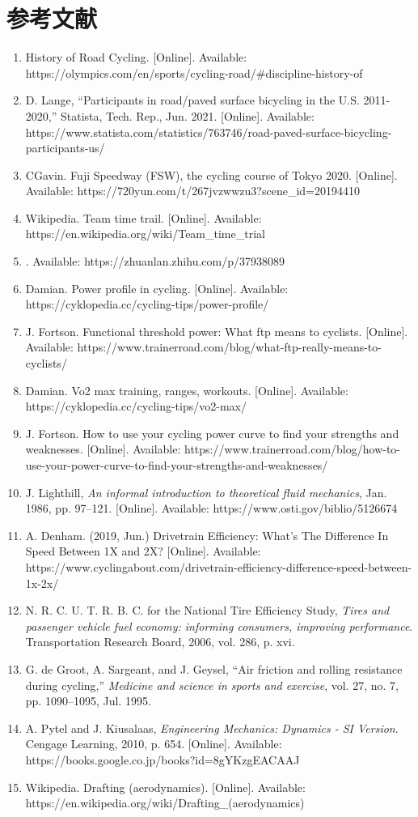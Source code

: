 \documentclass[11pt,a4paper]{ctexart}
\begin{document}
\section*{参考文献}
\begin{enumerate}
\item History of Road Cycling. [Online]. Available: https://olympics.com/en/sports/cycling-road/\#discipline-history-of
\item D. Lange, ``Participants in road/paved surface bicycling in the U.S. 2011-2020,'' Statista, Tech. Rep., Jun. 2021. [Online]. Available: https://www.statista.com/statistics/763746/road-paved-surface-bicycling-participants-us/
\item CGavin. Fuji Speedway (FSW), the cycling course of Tokyo 2020. [Online]. Available: https://720yun.com/t/267jvzwwzu3?scene\_id=20194410
\item Wikipedia. Team time trail. [Online]. Available: https://en.wikipedia.org/wiki/Team\_time\_trial
\item [Online]. Available: https://zhuanlan.zhihu.com/p/37938089
\item Damian. Power profile in cycling. [Online]. Available: https://cyklopedia.cc/cycling-tips/power-profile/
\item J. Fortson. Functional threshold power: What ftp means to cyclists. [Online]. Available: https://www.trainerroad.com/blog/what-ftp-really-means-to-cyclists/
\item Damian. Vo2 max training, ranges, workouts. [Online]. Available: https://cyklopedia.cc/cycling-tips/vo2-max/
\item J. Fortson. How to use your cycling power curve to find your strengths and weaknesses. [Online]. Available: https://www.trainerroad.com/blog/how-to-use-your-power-curve-to-find-your-strengths-and-weaknesses/
\item J. Lighthill, \emph{An informal introduction to theoretical fluid mechanics}, Jan. 1986, pp. 97--121. [Online]. Available: https://www.osti.gov/biblio/5126674
\item A. Denham. (2019, Jun.) Drivetrain Efficiency: What's The Difference In Speed Between 1X and 2X? [Online]. Available: https://www.cyclingabout.com/drivetrain-efficiency-difference-speed-between-1x-2x/
\item N. R. C. U. T. R. B. C. for the National Tire Efficiency Study, \emph{Tires and passenger vehicle fuel economy: informing consumers, improving performance}. Transportation Research Board, 2006, vol. 286, p. xvi.
\item G. de Groot, A. Sargeant, and J. Geysel, ``Air friction and rolling resistance during cycling,'' \emph{Medicine and science in sports and exercise}, vol. 27, no. 7, pp. 1090--1095, Jul. 1995.
\item A. Pytel and J. Kiusalaas, \emph{Engineering Mechanics: Dynamics - SI Version}. Cengage Learning, 2010, p. 654. [Online]. Available: https://books.google.co.jp/books?id=8gYKzgEACAAJ
\item Wikipedia. Drafting (aerodynamics). [Online]. Available: https://en.wikipedia.org/wiki/Drafting\_(aerodynamics)
\end{enumerate}
\end{document}
